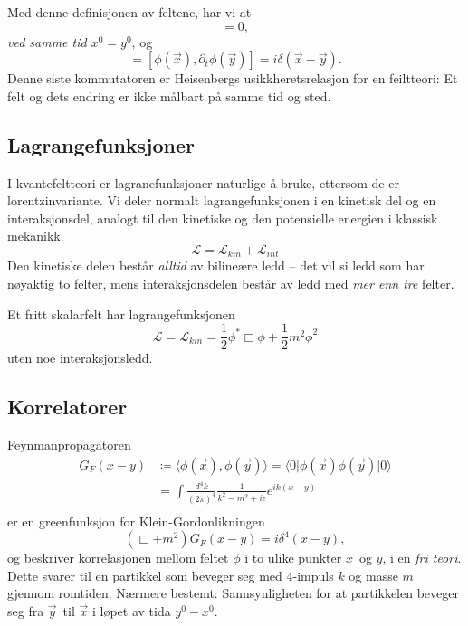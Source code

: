 \documentclass{article}
\renewcommand{\L}{\mathcal{L}}
\newcommand{\KG}{\Box + m^2}
\newcommand{\bra}[1]{\langle {#1} \mathclose|}
\newcommand{\ket}[1]{\mathopen| {#1} \rangle}
\begin{document}
Med denne definisjonen av feltene, har vi at
\begin{equation*}
    [\phi(\vec{x}), \phi(\vec{y})] = 0,
\end{equation*}
\emph{ved samme tid $x^0 = y^0$}, og 
\begin{equation*}
    [\phi(\vec{x}), \pi(\vec{y})] 
        = [\phi(\vec{x}), \partial_t \phi(\vec{y})] 
        = i \delta(\vec{x} - \vec{y}).
\end{equation*}
Denne siste kommutatoren er Heisenbergs usikkheretsrelasjon for en feiltteori:
Et felt og dets endring er ikke målbart på samme tid og sted.

\subsection{Lagrangefunksjoner}
I kvantefeltteori er lagranefunksjoner naturlige å bruke, ettersom de er lorentzinvariante.
Vi deler normalt lagrangefunksjonen i en kinetisk del og en interaksjonsdel, analogt til den kinetiske og den potensielle energien i klassisk mekanikk.
\begin{equation*}
    \L = \L_{kin} + \L_{int} 
\end{equation*}
Den kinetiske delen består \emph{alltid} av bilineære ledd -- det vil si ledd som har nøyaktig to felter, mens interaksjonsdelen består av ledd med \emph{mer enn tre} felter.

Et fritt skalarfelt har lagrangefunksjonen
\begin{equation}
    \L = \L_{kin} = \frac{1}{2} \phi^* \Box \phi + \frac{1}{2} m^2 \phi^2
    \label{eq:L_free}
\end{equation}
uten noe interaksjonsledd.

\subsection{Korrelatorer}
Feynmanpropagatoren 
\begin{equation*}
    \begin{split}
        G_F(x - y)
        &\coloneqq \langle \phi(\vec{x}), \phi(\vec{y}) \rangle
        = \bra{0} \phi(\vec{x}) \phi(\vec{y}) \ket{0}\\
        &= \int \frac{d^4k}{(2\pi)^4} \frac{1}{k^2 - m^2 + i\epsilon} e^{ik(x - y)}\\
    \end{split}
\end{equation*}
er en greenfunksjon for Klein-Gordonlikningen
\begin{equation*}
    (\KG) G_F(x-y) = i \delta^4(x - y),
\end{equation*}
og beskriver korrelasjonen mellom feltet $\phi$ i to ulike punkter $x$ og $y$, i en \emph{fri teori}.
Dette svarer til en partikkel som beveger seg med 4-impuls $k$ og masse $m$ gjennom romtiden. Nærmere bestemt:
Sannsynligheten for at partikkelen beveger seg fra $\vec{y}$ til $\vec{x}$ i løpet av tida $y^0 - x^0$.
\end{document}

